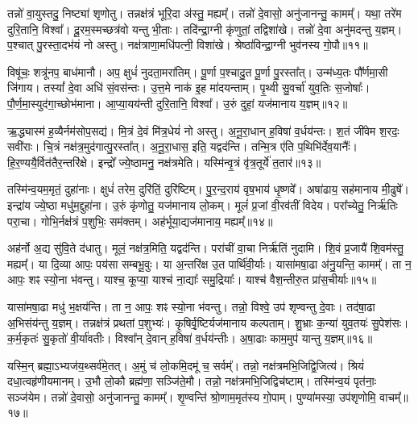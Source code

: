 तन्नो॑ वा॒युस्तदु॒ निष्ट्या॑ शृणोतु।
तन्नक्ष॑त्रं भूरि॒दा अ॑स्तु॒ मह्यम्᳚।
तन्नो॑ दे॒वासो॒ अनु॑जानन्तु॒ कामम्᳚।
यथा॒ तरे॑म दुरि॒तानि॒ विश्वा᳚।
दू॒रम॒स्मच्छत्र॑वो यन्तु भी॒ताः।
तदि॑न्द्रा॒ग्नी कृ॑णुतां॒ तद्विशा॑खे।
तन्नो॑ दे॒वा अनु॑मदन्तु य॒ज्ञम्।
प॒श्चात् पु॒रस्ता॒दभ॑यं नो अस्तु।
नक्ष॑त्राणा॒मधि॑पत्नी॒ विशा॑खे।
श्रेष्ठा॑विन्द्रा॒ग्नी भुव॑नस्य गो॒पौ॥११॥\ip

विषू॑चः॒ शत्रू॑नप॒ बाध॑मानौ।
अप॒ क्षुधं॑ नुदता॒मरा॑तिम्।
पू॒र्णा प॒श्चादु॒त पू॒र्णा पु॒रस्ता᳚त्।
उन्म॑ध्य॒तः पौ᳚र्णमा॒सी जि॑गाय।
तस्यां᳚ दे॒वा अधि॑ सं॒वस॑न्तः।
उ॒त्त॒मे नाक॑ इ॒ह मा॑दयन्ताम्।
पृ॒थ्वी सु॒वर्चा॑ युव॒तिः स॒जोषाः᳚।
पौ॒र्ण॒मा॒स्युद॑गा॒च्छोभ॑माना।
आ॒प्या॒यय॑न्ती दुरि॒तानि॒ विश्वा᳚।
उ॒रुं दुहां॒ यज॑मानाय य॒ज्ञम्॥१२॥\ip\anuvakamend[चि॒त्रभा॑नु॒र्यज॑माने दधातु ह॒विर्नः॒ पाथ॒श्चेतो॑ जुषन्ता॒ञ्चेतो॑ मदेम॒ रोच॑माना॒मरा॑तीर्गो॒पौ य॒ज्ञम्]

ऋ॒द्ध्यास्म॑ ह॒व्यैर्नम॑सोप॒सद्य॑।
मि॒त्रं दे॒वं मि॑त्र॒धेयं॑ नो अस्तु।
अ॒नू॒रा॒धान् ह॒विषा॑ व॒र्धय॑न्तः।
श॒तं जी॑वेम श॒रदः॒ सवी॑राः।
चि॒त्रं नक्ष॑त्र॒मुद॑गात्पु॒रस्ता᳚त्।
अ॒नू॒रा॒धास॒ इति॒ यद्वद॑न्ति।
तन्मि॒त्र ए॑ति प॒थिभि॑र्देव॒यानैः᳚।
हि॒र॒ण्ययै॒र्वित॑तै\-र॒न्तरि॑क्षे।
इन्द्रो᳚ ज्ये॒ष्ठामनु॒ नक्ष॑त्रमेति।
यस्मि॑न्वृ॒त्रं वृ॑त्र॒तूर्ये॑ त॒तार॑॥१३॥\ip

तस्मि॑न्व॒यम॒मृतं॒ दुहा॑नाः।
क्षुधं॑ तरेम॒ दुरि॑तिं॒ दुरि॑ष्टिम्।
पु॒र॒न्द॒राय॑ वृष॒भाय॑ धृ॒ष्णवे᳚।
अषा॑ढाय॒ सह॑मानाय मी॒ढुषे᳚।
इन्द्रा॑य ज्ये॒ष्ठा मधु॑म॒द्दुहा॑ना।
उ॒रुं कृ॑णोतु॒ यज॑मानाय लो॒कम्।
मूलं॑ प्र॒जां वी॒रव॑तीं विदेय।
परा᳚च्येतु॒ निर्\mbox{}ऋ॑तिः परा॒चा।
गोभि॒र्नक्ष॑त्रं प॒शुभिः॒ सम॑क्तम्।
अह॑र्भूया॒द्यज॑मानाय॒ मह्यम्᳚॥१४॥\ip

अह॑र्नो अ॒द्य सु॑वि॒ते द॑धातु।
मूलं॒ नक्ष॑त्र॒मिति॒ यद्वद॑न्ति।
परा॑चीं वा॒चा निर्\mbox{}ऋ॑तिं नुदामि।
शि॒वं प्र॒जायै॑ शि॒वम॑स्तु॒ मह्यम्᳚।
या दि॒व्या आपः॒ पय॑सा सम्बभू॒वुः।
या अ॒न्तरि॑क्ष उ॒त पार्थि॑वी॒र्याः।
यासा॑मषा॒ढा अ॑नु॒यन्ति॒ कामम्᳚।
ता न॒ आपः॒ शꣴ स्यो॒ना भ॑वन्तु।
याश्च॒ कूप्या॒ याश्च॑ ना॒द्याः᳚ समु॒द्रियाः᳚।
याश्च॑ वैश॒न्तीरु॒त प्रा॑स॒चीर्याः॥१५॥\ip

यासा॑मषा॒ढा मधु॑ भ॒क्षय॑न्ति।
ता न॒ आपः॒ शꣴ स्यो॒ना भ॑वन्तु।
तन्नो॒ विश्वे॒ उप॑ शृण्वन्तु दे॒वाः।
तद॑षा॒ढा अ॒भिसंय॑न्तु य॒ज्ञम्।
तन्नक्ष॑त्रं प्रथतां प॒शुभ्यः॑।
कृ॒षिर्वृ॒ष्टिर्यज॑मानाय कल्पताम्।
शु॒भ्राः क॒न्या॑ युव॒तयः॑ सु॒पेश॑सः।
क॒र्म॒कृतः॑ सु॒कृतो॑ वी॒र्या॑वतीः।
विश्वा᳚न् दे॒वान् ह॒विषा॑ व॒र्धय॑न्तीः।
अ॒षा॒ढाः काम॒मुप॑ यान्तु य॒ज्ञम्॥१६॥\ip

यस्मि॒न् ब्रह्मा॒\-ऽभ्यज॑य॒थ्सर्व॑मे॒तत्।
अ॒मुं च॑ लो॒कमि॒दमू॑ च॒ सर्वम्᳚।
तन्नो॒ नक्ष॑त्रमभि॒जिद्वि॒जित्य॑।
श्रियं॑ दधा॒त्वहृ॑णीय\-मानम्।
उ॒भौ लो॒कौ ब्रह्म॑णा॒ सञ्जि॑ते॒मौ।
तन्नो॒ नक्ष॑त्रमभि॒जिद्विच॑ष्टाम्।
तस्मि॑न्व॒यं पृत॑नाः॒ सञ्ज॑येम।
तन्नो॑ दे॒वासो॒ अनु॑जानन्तु॒ कामम्᳚।
शृ॒ण्वन्ति॑ श्रो॒णाम॒मृत॑स्य गो॒पाम्।
पुण्या॑मस्या॒ उप॑शृणोमि॒ वाचम्᳚॥१७॥\ip


